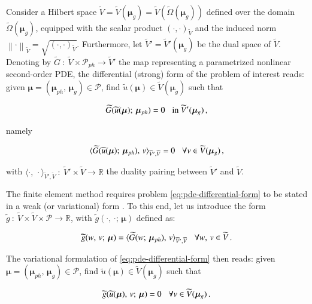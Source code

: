 \documentclass[longtitle]{elsarticle}
\numberwithin{equation}{section}
\theoremstyle{theorem}
\theoremstyle{definition}
\theoremstyle{remark}
\theoremstyle{proposition}
\numberwithin{figure}{section}
\newcommand{\norm}[1]{\left\lVert#1\right\rVert}
\newcommand{\wt}[1]{\widetilde{#1}}
\newcommand{\bg}[1]{\boldsymbol{#1}}
\begin{document}
		Consider a Hilbert space $\wt{V} = \wt{V}(\bg{\mu}_g) = \wt{V}(\wt{\Omega}(\boldsymbol{\mu}_g))$ defined over the domain $\wt{\Omega}(\boldsymbol{\mu}_g)$, equipped with the scalar product $(\cdot, \cdot)_{\wt{V}}$ and the induced norm $\norm{\cdot}_{\wt{V}} = \sqrt{(\cdot, \cdot)_{\wt{V}}}$. Furthermore, let $\wt{V}' = \wt{V}'(\boldsymbol{\mu}_g)$ be the dual space of $\wt{V}$. Denoting by $\wt{G} ~ : ~ \wt{V} \times \mathcal{P}_{ph} \rightarrow \wt{V}'$ the map representing a parametrized nonlinear second-order PDE, the differential (strong) form of the problem of interest reads: given $\bg{\mu} = (\bg{\mu}_{ph}, \, \bg{\mu}_g) \in \mathcal{P}$, find $\wt{u}(\boldsymbol{\mu}) \in \wt{V}(\bg{\mu}_g)$ such that
		\begin{linenomath}\begin{equation}
			\label{eq:pde-differential-form}
			\wt{G}(\wt{u}(\bg{\mu}); \, \bg{\mu}_{ph}) = 0 \hspace*{0.3cm} \text{in $\wt{V}'(\bg{\mu}_g)$} \, ,
		\end{equation}\end{linenomath}
		namely
		\begin{linenomath}\begin{linenomath}\begin{equation*}
			\langle \wt{G}(\wt{u}(\bg{\mu}); \, \bg{\mu}_{ph}), \, v \rangle_{\wt{V}',\wt{V}} = 0 \hspace*{0.3cm} \forall v \in \wt{V}(\bg{\mu}_g) \, ,
		\end{equation*}\end{linenomath}\end{linenomath}
		with $\langle \cdot, \, \cdot \rangle_{\wt{V}',\wt{V}} ~ : ~ \wt{V}' \times \wt{V} \rightarrow \mathbb{R}$ the duality pairing between $\wt{V}'$ and $\wt{V}$. 		

		The finite element method requires problem \eqref{eq:pde-differential-form} to be stated in a weak (or variational) form \cite{Qua10}. To this end, let us introduce the form $\wt{g} ~ : ~ \wt{V} \times \wt{V} \times \mathcal{P} \rightarrow \mathbb{R}$, with $\wt{g}(\cdot, \, \cdot; \, \bg{\mu})$ defined as:
		\begin{linenomath}\begin{linenomath}\begin{equation*}
			\wt{g}(w, \, v; \, \bg{\mu}) = \langle \wt{G}(w; \, \bg{\mu}_{ph}), \, v \rangle_{\wt{V}',\wt{V}} \hspace*{0.3cm} \forall w, \, v \in \wt{V} \, .
		\end{equation*}\end{linenomath}\end{linenomath}
		The variational formulation of \eqref{eq:pde-differential-form} then reads: given $\bg{\mu} = (\bg{\mu}_{ph}, \, \bg{\mu}_g) \in \mathcal{P}$, find $\wt{u}(\bg{\mu}) \in \wt{V}(\bg{\mu}_g)$ such that
		\begin{linenomath}\begin{equation*}
			\wt{g}(\wt{u}(\bg{\mu}), \, v; \, \bg{\mu}) = 0 \hspace*{0.3cm} \forall v \in \wt{V}(\bg{\mu}_g) \, .
		\end{equation*}\end{linenomath}
		
\end{document}
